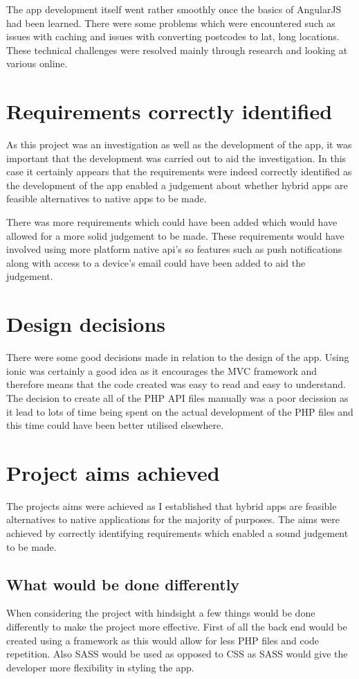 The app development itself went rather smoothly once the basics of AngularJS had been learned. There were some problems which were encountered such as issues with caching and issues with converting postcodes to lat, long locations. These technical challenges were resolved mainly through research and looking at various online.      
\section{Requirements correctly identified}
As this project was an investigation as well as the development of the app, it was important that the development was carried out to aid the investigation. In this case it certainly appears that the requirements were indeed correctly identified as the development of the app enabled a judgement about whether hybrid apps are feasible alternatives to native apps to be made.

There was more requirements which could have been added which would have allowed for a more solid judgement to be made. These requirements would have involved using more platform native api's so features such as push notifications along with access to a device's email could have been added to aid the judgement.
\section{Design decisions}
There were some good decisions made in relation to the design of the app. Using ionic was certainly a good idea as it encourages the MVC framework and therefore means that the code created was easy to read and easy to understand. The decision to create all of the PHP API files manually was a poor decission as it lead to lots of time being spent on the actual development of the PHP files and this time could have been better utilised elsewhere.
\section{Project aims achieved}
The projects aims were achieved as I established that hybrid apps are feasible alternatives to native applications for the majority of purposes. The aims were achieved by correctly identifying requirements which enabled a sound judgement to be made.
\subsection{What would be done differently}
When considering the project with hindsight a few things would be done differently to make the project more effective. First of all the back end would be created using a framework as this would allow for less PHP files and code repetition. Also SASS would be used as opposed to CSS as SASS would give the developer more flexibility in styling the app.

